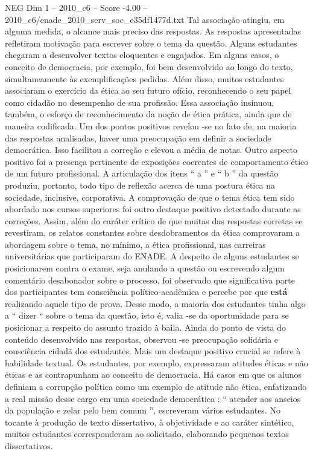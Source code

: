 \begin{textsample}{NEG Dim 1 – 2010\_c6 – Score -4.00 – 2010\_c6/enade\_2010\_serv\_soc\_e35df1477d.txt}
Tal associação atingiu, em alguma medida, o alcance mais preciso das respostas.
As respostas apresentadas refletiram motivação para escrever sobre o tema da questão.
Alguns estudantes chegaram a desenvolver textos eloquentes e engajados.
Em alguns casos, o conceito de democracia, por exemplo, foi bem desenvolvido ao longo do texto, simultaneamente às exemplificações pedidas.
Além disso, muitos estudantes associaram o exercício da ética ao seu futuro ofício, reconhecendo o seu papel como cidadão no desempenho de sua profissão.
Essa associação insinuou, também, o esforço de reconhecimento da noção de ética prática, ainda que de maneira codificada.
Um dos pontos positivos revelou -se no fato de, na maioria das respostas analisadas, haver uma preocupação em definir a sociedade democrática.
Isso facilitou a correção e elevou a média de notas.
Outro aspecto positivo foi a presença pertinente de exposições coerentes de comportamento ético de um futuro profissional.
A articulação dos itens “ a ” e “ b ” da questão produziu, portanto, todo tipo de reflexão acerca de uma postura ética na sociedade, inclusive, corporativa.
A comprovação de que o tema ética tem sido abordado nos cursos superiores foi outro destaque positivo detectado durante as correções.
Assim, além do caráter crítico de que muitas das respostas corretas se revestiram, os relatos constantes sobre desdobramentos da ética comprovaram a abordagem sobre o tema, no mínimo, a ética profissional, nas carreiras universitárias que participaram do ENADE.
A despeito de alguns estudantes se posicionarem contra o exame, seja anulando a questão ou escrevendo algum comentário desabonador sobre o processo, foi observado que significativa parte dos participantes tem consciência político-acadêmica e percebe por que \textbf{está} realizando aquele tipo de prova.
Desse modo, a maioria dos estudantes tinha algo a “ dizer “ sobre o tema da questão, isto é, valia -se da oportunidade para se posicionar a respeito do assunto trazido à baila.
Ainda do ponto de vista do conteúdo desenvolvido nas respostas, observou -se preocupação solidária e consciência cidadã dos estudantes.
Mais um destaque positivo crucial se refere à habilidade textual.
Os estudantes, por exemplo, expressaram atitudes éticas e não éticas e as contrapunham ao conceito de democracia.
Há casos em que os alunos definiam a corrupção política como um exemplo de atitude não ética, enfatizando a real missão desse cargo em uma sociedade democrática : “ atender aos anseios da população e zelar pelo bem comum ”, escreveram vários estudantes.
No tocante à produção de texto dissertativo, à objetividade e ao caráter sintético, muitos estudantes corresponderam ao solicitado, elaborando pequenos textos dissertativos.

\end{textsample}
